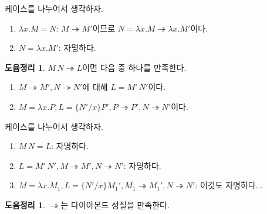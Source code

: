 \documentclass[b5paper, 10pt]{book}
\theoremstyle{definition}
\newtheorem{lem}[defn]{도윰정리}
\newenvironment{pf*}{\pushQED{\qed}\pf}{\popQED\endpf}
\begin{document}
\begin{pf*}
    케이스를 나누어서 생각하자.
    \begin{enumerate}
        \item $\lambda x. M = N$: $M \twoheadrightarrow M'$이므로 $N = \lambda x .M
        \twoheadrightarrow \lambda x. M'$이다.
        \item $N = \lambda x . M'$: 자명하다.
    \end{enumerate}
\end{pf*}
\begin{lem} \label{application lemma}
    $M \, N \twoheadrightarrow L$이면 다음 중 하나를 만족한다.
    \begin{enumerate}
        \item $M \twoheadrightarrow M', N \twoheadrightarrow N'$에 대해 $L = M' \, N'$이다.
        \item $M = \lambda x. P, L = \{N' / x\} P', P \twoheadrightarrow P', 
        N \twoheadrightarrow N'$이다.
    \end{enumerate}
\end{lem}
\begin{pf*}
    케이스를 나누어서 생각하자.
    \begin{enumerate}
        \item $M\, N = L$:
        자명하다. 
        \item $L = M' \, N' , M \twoheadrightarrow M', N \twoheadrightarrow N'$:
        자명하다.
        \item $M = \lambda x. M_1 ,L = \{N'/x\} M_1', M_1 \twoheadrightarrow M_1',
        N \twoheadrightarrow N'$:
        이것도 자명하다...
    \end{enumerate}
\end{pf*}
\begin{lem} \label{twohead diamond}
    $\twoheadrightarrow$는 다이아몬드 성질을 만족한다.
\end{lem}
\end{document}
